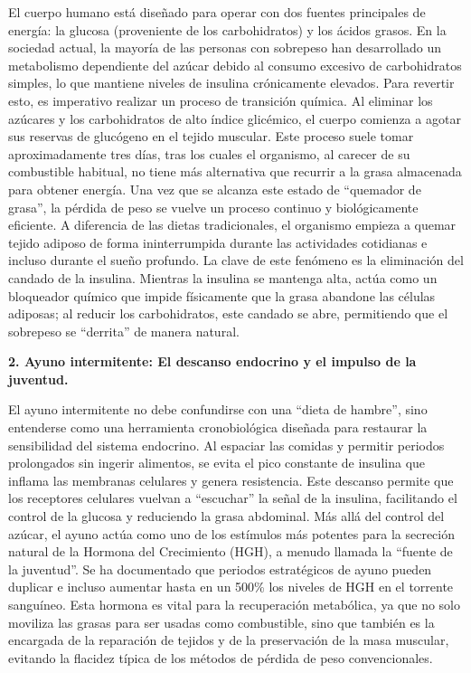 \documentclass[
  spanish,
]{article}
\begin{document}
El cuerpo humano está diseñado para operar con dos fuentes principales de energía: la glucosa (proveniente de los carbohidratos) y los ácidos grasos. En la sociedad actual, la mayoría de las personas con sobrepeso han desarrollado un metabolismo dependiente del azúcar debido al consumo excesivo de carbohidratos simples, lo que mantiene niveles de insulina crónicamente elevados. Para revertir esto, es imperativo realizar un proceso de transición química. Al eliminar los azúcares y los carbohidratos de alto índice glicémico, el cuerpo comienza a agotar sus reservas de glucógeno en el tejido muscular. Este proceso suele tomar aproximadamente tres días, tras los cuales el organismo, al carecer de su combustible habitual, no tiene más alternativa que recurrir a la grasa almacenada para obtener energía.
Una vez que se alcanza este estado de ``quemador de grasa'', la pérdida de peso se vuelve un proceso continuo y biológicamente eficiente. A diferencia de las dietas tradicionales, el organismo empieza a quemar tejido adiposo de forma ininterrumpida durante las actividades cotidianas e incluso durante el sueño profundo. La clave de este fenómeno es la eliminación del candado de la insulina. Mientras la insulina se mantenga alta, actúa como un bloqueador químico que impide físicamente que la grasa abandone las células adiposas; al reducir los carbohidratos, este candado se abre, permitiendo que el sobrepeso se ``derrita'' de manera natural.

\textbf{2. Ayuno intermitente: El descanso endocrino y el impulso de la juventud.}

El ayuno intermitente no debe confundirse con una ``dieta de hambre'', sino entenderse como una herramienta cronobiológica diseñada para restaurar la sensibilidad del sistema endocrino. Al espaciar las comidas y permitir periodos prolongados sin ingerir alimentos, se evita el pico constante de insulina que inflama las membranas celulares y genera resistencia. Este descanso permite que los receptores celulares vuelvan a ``escuchar'' la señal de la insulina, facilitando el control de la glucosa y reduciendo la grasa abdominal.
Más allá del control del azúcar, el ayuno actúa como uno de los estímulos más potentes para la secreción natural de la Hormona del Crecimiento (HGH), a menudo llamada la ``fuente de la juventud''. Se ha documentado que periodos estratégicos de ayuno pueden duplicar e incluso aumentar hasta en un 500\% los niveles de HGH en el torrente sanguíneo. Esta hormona es vital para la recuperación metabólica, ya que no solo moviliza las grasas para ser usadas como combustible, sino que también es la encargada de la reparación de tejidos y de la preservación de la masa muscular, evitando la flacidez típica de los métodos de pérdida de peso convencionales.
\end{document}

